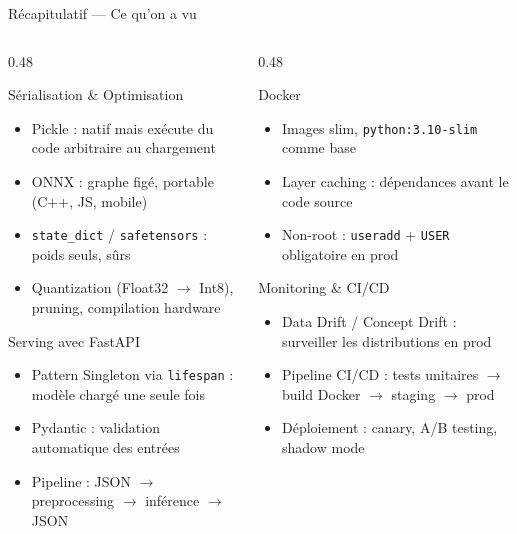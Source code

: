 \documentclass[aspectratio=169, 10pt]{beamer}
\begin{document}
\begin{frame}{Récapitulatif --- Ce qu'on a vu}
  \begin{columns}[T]
    \begin{column}{0.48\textwidth}
      \begin{block}{Sérialisation \& Optimisation}
        \small
        \begin{itemize}\setlength{\itemsep}{1pt}
          \item Pickle : natif mais exécute du code arbitraire au chargement
          \item ONNX : graphe figé, portable (C++, JS, mobile)
          \item \texttt{state\_dict} / \texttt{safetensors} : poids seuls, sûrs
          \item Quantization (Float32 $\to$ Int8), pruning, compilation hardware
        \end{itemize}
      \end{block}
      \vspace{3pt}
      \begin{block}{Serving avec FastAPI}
        \small
        \begin{itemize}\setlength{\itemsep}{1pt}
          \item Pattern Singleton via \texttt{lifespan} : modèle chargé une seule fois
          \item Pydantic : validation automatique des entrées
          \item Pipeline : JSON $\to$ preprocessing $\to$ inférence $\to$ JSON
        \end{itemize}
      \end{block}
    \end{column}
    \begin{column}{0.48\textwidth}
      \begin{block}{Docker}
        \small
        \begin{itemize}\setlength{\itemsep}{1pt}
          \item Images slim, \texttt{python:3.10-slim} comme base
          \item Layer caching : dépendances avant le code source
          \item Non-root : \texttt{useradd} + \texttt{USER} obligatoire en prod
        \end{itemize}
      \end{block}
      \vspace{3pt}
      \begin{block}{Monitoring \& CI/CD}
        \small
        \begin{itemize}\setlength{\itemsep}{1pt}
          \item Data Drift / Concept Drift : surveiller les distributions en prod
          \item Pipeline CI/CD : tests unitaires $\to$ build Docker $\to$ staging $\to$ prod
          \item Déploiement : canary, A/B testing, shadow mode
        \end{itemize}
      \end{block}
    \end{column}
  \end{columns}
\end{frame}
\end{document}
